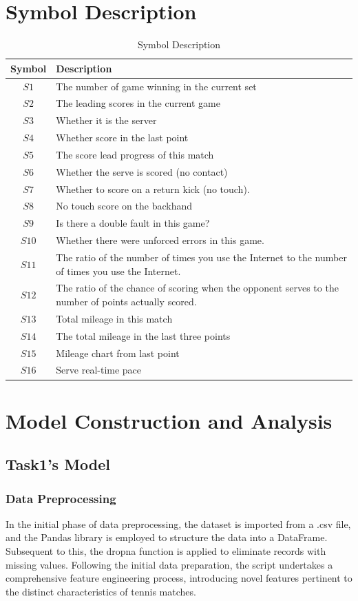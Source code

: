 \documentclass{article}
\begin{document}
\section{Symbol Description}
\begin{table}[H]
\centering
\begin{tabular}{|c|l|}
\hline
\textbf{Symbol} & \textbf{Description} \\ \hline
$S1$ & The number of game winning in the current set \\ \hline
$S2$ & The leading scores in the current game \\ \hline
$S3$ & Whether it is the server \\ \hline
$S4$ & Whether score in the last point \\ \hline
$S5$ & The score lead progress of this match\\ \hline
$S6$ & Whether the serve is scored (no contact) \\ \hline
$S7$ & Whether to score on a return kick (no touch). \\ \hline
$S8$ & No touch score on the backhand \\ \hline
$S9$ & Is there a double fault in this game? \\ \hline
$S10$ & Whether there were unforced errors in this game. \\ \hline
$S11$ & The ratio of the number of times you use the Internet to the number of times you use the Internet. \\ \hline
$S12$ & The ratio of the chance of scoring when the opponent serves to the number of points actually scored. \\ \hline
$S13$ & Total mileage in this match \\ \hline
$S14$ & The total mileage in the last three points \\ \hline
$S15$ & Mileage chart from last point \\ \hline
$S16$ & Serve real-time pace \\ \hline
\end{tabular}
\caption{Symbol Description}
\end{table}
\section{Model Construction and Analysis}
\subsection{Task1's Model}
\subsubsection{Data Preprocessing}
In the initial phase of data preprocessing, the dataset is imported from a .csv file, and the Pandas library is employed to structure the data into a DataFrame. Subsequent to this, the dropna function is applied to eliminate records with missing values. Following the initial data preparation, the script undertakes a comprehensive feature engineering process, introducing novel features pertinent to the distinct characteristics of tennis matches.
\end{document}
